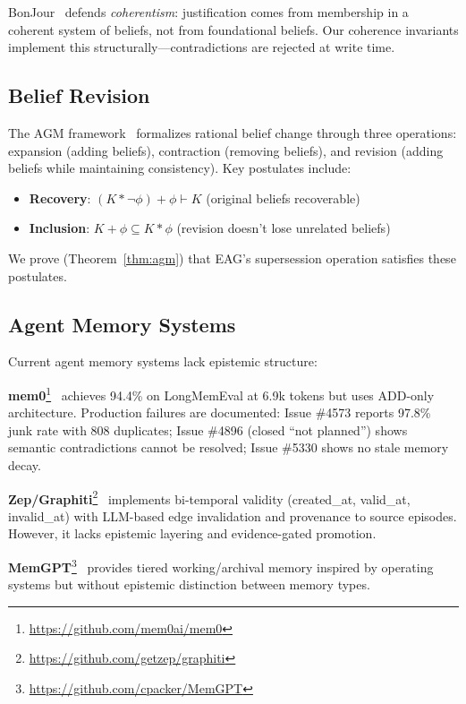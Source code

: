 \documentclass[11pt,letterpaper]{article}
\begin{document}
BonJour~\cite{bonjour1985} defends \textit{coherentism}: justification comes from membership in a coherent system of beliefs, not from foundational beliefs. Our coherence invariants implement this structurally---contradictions are rejected at write time.

\subsection{Belief Revision}

The AGM framework~\cite{agm1985} formalizes rational belief change through three operations: expansion (adding beliefs), contraction (removing beliefs), and revision (adding beliefs while maintaining consistency). Key postulates include:
\begin{itemize}[noitemsep]
    \item \textbf{Recovery}: $(K * \neg\phi) + \phi \vdash K$ (original beliefs recoverable)
    \item \textbf{Inclusion}: $K + \phi \subseteq K * \phi$ (revision doesn't lose unrelated beliefs)
\end{itemize}

We prove (Theorem~\ref{thm:agm}) that EAG's supersession operation satisfies these postulates.

\subsection{Agent Memory Systems}

Current agent memory systems lack epistemic structure:

\textbf{mem0}\footnote{\url{https://github.com/mem0ai/mem0}}~\cite{mem0} achieves 94.4\% on LongMemEval at 6.9k tokens but uses ADD-only architecture. Production failures are documented: Issue \#4573 reports 97.8\% junk rate with 808 duplicates; Issue \#4896 (closed ``not planned'') shows semantic contradictions cannot be resolved; Issue \#5330 shows no stale memory decay.

\textbf{Zep/Graphiti}\footnote{\url{https://github.com/getzep/graphiti}}~\cite{graphiti2025} implements bi-temporal validity (created\_at, valid\_at, invalid\_at) with LLM-based edge invalidation and provenance to source episodes. However, it lacks epistemic layering and evidence-gated promotion.

\textbf{MemGPT}\footnote{\url{https://github.com/cpacker/MemGPT}}~\cite{memgpt2023} provides tiered working/archival memory inspired by operating systems but without epistemic distinction between memory types.
\end{document}
